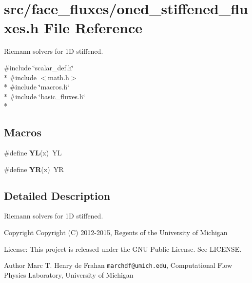 \section{src/face\-\_\-fluxes/oned\-\_\-stiffened\-\_\-fluxes.h File Reference}
\label{oned__stiffened__fluxes_8h}


Riemann solvers for 1\-D stiffened.  


{\ttfamily \#include \char`\"{}scalar\-\_\-def.\-h\char`\"{}}\\*
{\ttfamily \#include $<$math.\-h$>$}\\*
{\ttfamily \#include \char`\"{}macros.\-h\char`\"{}}\\*
{\ttfamily \#include \char`\"{}basic\-\_\-fluxes.\-h\char`\"{}}\\*
\subsection*{Macros}
\begin{DoxyCompactItemize}
\item 
\#define {\bfseries Y\-L}(x)~Y\-L\label{oned__stiffened__fluxes_8h_a77cb2523048b3756423bcc1051e4f30c}

\item 
\#define {\bfseries Y\-R}(x)~Y\-R\label{oned__stiffened__fluxes_8h_ac574c67246847dfb54604debb74f7e95}

\end{DoxyCompactItemize}


\subsection{Detailed Description}
Riemann solvers for 1\-D stiffened. \begin{DoxyCopyright}{Copyright}
Copyright (C) 2012-\/2015, Regents of the University of Michigan 
\end{DoxyCopyright}
\begin{DoxyParagraph}{License\-:}
This project is released under the G\-N\-U Public License. See L\-I\-C\-E\-N\-S\-E. 
\end{DoxyParagraph}
\begin{DoxyAuthor}{Author}
Marc T. Henry de Frahan {\tt marchdf@umich.\-edu}, Computational Flow Physics Laboratory, University of Michigan 
\end{DoxyAuthor}
